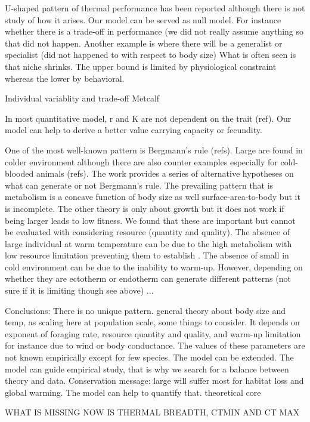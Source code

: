  U-shaped pattern of thermal performance has been reported although there is not study of how it arises.
 Our model can be served as null model.
 For instance whether there is a trade-off in performance (we did not really assume anything so that did not happen.
 Another example is where there will be a generalist or specialist (did not happened to with respect to body size)
 What is often seen is that niche shrinks.
 The upper bound is limited by physiological  constraint whereas the lower by behavioral.
 
 Individual variablity and trade-off Metcalf
  
 In most quantitative model, r and K are not dependent on the trait (ref).
 Our model can help to derive a better value carrying capacity or fecundity.
 

One of the most well-known pattern is Bergmann's rule (refs).
Large are found in colder environment although there are also counter examples especially for cold-blooded animals (refs).
The work provides a series of alternative hypotheses on what can generate or not Bergmann's rule.
The prevailing pattern that is metabolism is a concave function of body size as well surface-area-to-body but it is incomplete.
The other theory is only about growth but it does not work if being larger leads to low fitness.
We found that these are important but cannot be evaluated with considering resource (quantity and quality).
The absence of large individual at warm temperature can be due to the high metabolism with low resource limitation preventing them to establish \citep{Angert2005}. 
The absence of small in cold environment can be due to the inability to warm-up.
However, depending on whether they are ectotherm or endotherm can generate different patterns (not sure if it is limiting though see above)
...

Conclusions:
There is no unique pattern.
general theory about body size and temp, as scaling here
at population scale, some things to consider.
It depends on exponent of foraging rate, resource quantity and quality, and warm-up limitation for instance due to wind or body conductance.
The values of these parameters  are not known empirically except for few species.
The model can be extended.
The model can guide empirical study, that is why we search for a balance between theory and data.
Conservation message: large will suffer most for habitat loss and global warming.
The model can help to quantify that. 
theoretical core
 

WHAT IS MISSING NOW IS THERMAL BREADTH, CTMIN AND CT MAX


